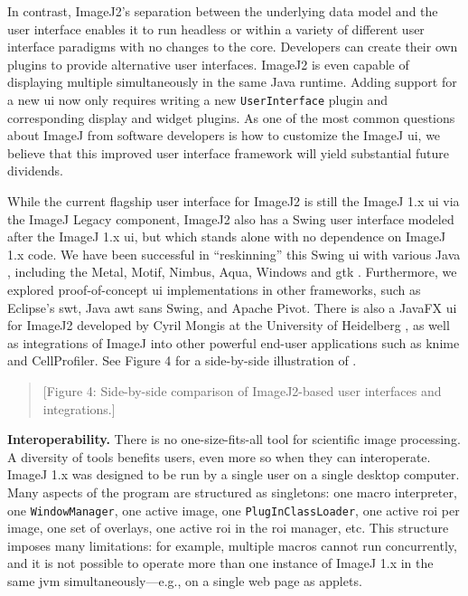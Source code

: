 \documentclass{bmcart}
\begin{document}
In contrast, ImageJ2's separation between the underlying data model and the
user interface enables it to run headless or within a variety of different user
interface paradigms with no changes to the core. Developers can create their
own plugins to provide alternative user interfaces. ImageJ2 is even capable of
displaying multiple  simultaneously in the same Java runtime.
Adding support for a new \acrshort{ui} now only requires writing a new
\texttt{UserInterface} plugin and corresponding display and widget plugins.
As one of the most common questions about ImageJ from software developers is
how to customize the ImageJ \acrshort{ui}, we believe that this improved user
interface framework will yield substantial future dividends.

While the current flagship user interface for ImageJ2 is still the ImageJ 1.x
\acrshort{ui} via the ImageJ Legacy component, ImageJ2 also has a Swing user
interface modeled after the ImageJ 1.x \acrshort{ui}, but which stands alone
with no dependence on ImageJ 1.x code. We have been successful in
``reskinning'' this Swing \acrshort{ui} with various Java ,
including the Metal, Motif, Nimbus, Aqua, Windows and \acrfull{gtk}
. Furthermore, we explored proof-of-concept \acrshort{ui}
implementations in other frameworks, such as Eclipse's \acrshort{swt}, Java
\acrshort{awt} sans Swing, and Apache Pivot. There is also a JavaFX
\acrshort{ui} for ImageJ2 developed by Cyril Mongis at the University of
Heidelberg \cite{imagejfx}, as well as integrations of ImageJ into other
powerful end-user applications such as \acrshort{knime} and CellProfiler. See
Figure 4 for a side-by-side illustration of .

\begin{quote}
[Figure 4: Side-by-side comparison of ImageJ2-based user interfaces and
integrations.]
\end{quote}

\textbf{Interoperability.} There is no one-size-fits-all tool for scientific
image processing. A diversity of tools benefits users, even more so when they
can interoperate. ImageJ 1.x was designed to be run by a single user on a
single desktop computer. Many aspects of the program are structured as
singletons: one macro interpreter, one \texttt{WindowManager}, one active
image, one \texttt{PlugInClassLoader}, one active \acrshort{roi} per image, one
set of overlays, one active \acrshort{roi} in the \acrshort{roi} manager, etc.
This structure imposes many limitations: for example, multiple macros cannot
run concurrently, and it is not possible to operate more than one instance of
ImageJ 1.x in the same \acrshort{jvm} simultaneously---e.g., on a single web
page as applets.
\end{document}
